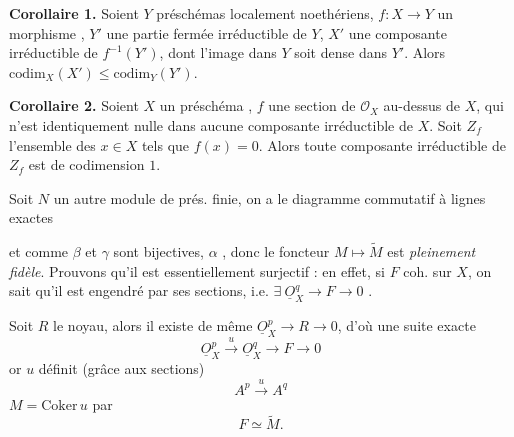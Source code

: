 \documentclass[11pt,a4paper]{article}
\begin{document}
\textbf{Corollaire 1.} Soient  $Y$ \struck{\ill{}} 
préschémas localement noethériens, $f : X \to Y$ un morphisme \struck{\ill{}},
$Y'$ une partie fermée irréductible de $Y$, $X'$ une composante irréductible de
$f^{-1}(Y')$, dont l'image dans $Y$ soit dense dans $Y'$. Alors
$\mathrm{codim}_{X}(X') \leq \mathrm{codim}_{Y}(Y')$.

\textbf{Corollaire 2.} Soient $X$ un préschéma 
\struck{\ill{}}, $f$ une section de $\mathcal{O}_{X}$ au-dessus de $X$, qui
n'est identiquement nulle dans aucune composante irréductible de $X$. Soit
$Z_{f}$ l'ensemble des $x \in X$ tels que $f(x) = 0$. Alors toute composante
irréductible de $Z_{f}$ est de codimension $1$.



Soit $N$ un autre module de prés. finie, on a le diagramme commutatif à lignes
exactes


et comme $\beta$ et $\gamma$ sont bijectives,  $\alpha$
\ill{}, donc le foncteur $M \mapsto \widetilde{M}$ est \emph{pleinement
fidèle}. Prouvons qu'il est essentiellement surjectif : en effet, si $F$
\ill{} coh. sur $X$, on sait qu'il est engendré par ses sections, i.e.
$\exists\ \underline{O}_{X}^{q} \to F \to 0$ \struck{\ill{}}
.

Soit $R$ le noyau, alors il existe de même $\underline{O}_{X}^{p} \to R \to 0$,
d'où une suite exacte
\[
\underline{O}_{X}^{p} \xrightarrow{u} \underline{O}_{X}^{q} \to F \to 0
\]
 or $u$ définit (grâce aux
sections)
\[
A^{p} \xrightarrow{u} A^{q}
\]
\ill{}  $M = \mathrm{Coker}\, u$ \ill{} \ill{} \ill{} par
\[
F \simeq \widetilde{M}.
\]
\end{document}

